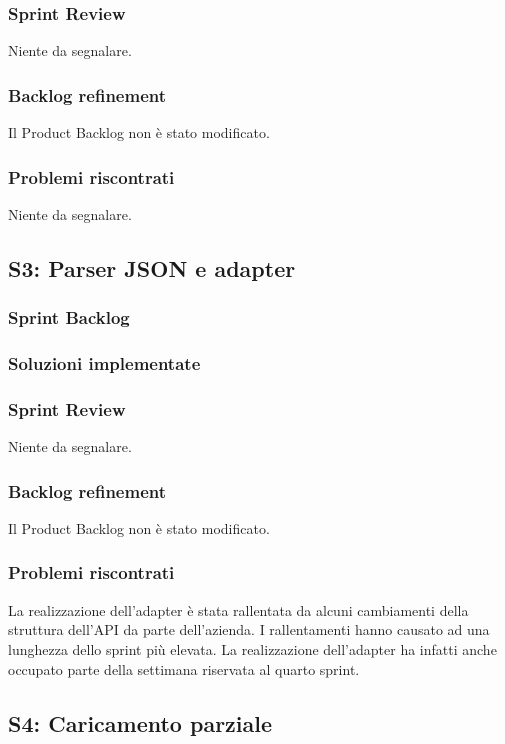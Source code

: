 \subsubsection{Sprint Review}
Niente da segnalare.

\subsubsection{Backlog refinement}
Il Product Backlog non è stato modificato.

\subsubsection{Problemi riscontrati}
Niente da segnalare.
\newpage

\subsection{S3: Parser JSON e adapter}
\subsubsection{Sprint Backlog}
\subsubsection{Soluzioni implementate}
\subsubsection{Sprint Review}
Niente da segnalare.

\subsubsection{Backlog refinement}
Il Product Backlog non è stato modificato.

\subsubsection{Problemi riscontrati}
La realizzazione dell'adapter è stata rallentata da alcuni cambiamenti della struttura dell'API da parte dell'azienda. I rallentamenti hanno causato ad una lunghezza dello sprint più elevata. La realizzazione dell'adapter ha infatti anche occupato parte della settimana riservata al quarto sprint.

\newpage

\subsection{S4: Caricamento parziale}
